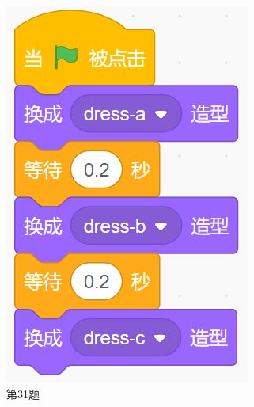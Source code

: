\documentclass[10pt, a4paper]{article}
\begin{document}
\begin{enumerate}
\begin{figure}[htbp]
\begin{minipage}[t]{.18\textwidth}
\begin{minipage}[t]{.35\textwidth}
                \end{minipage}
                \begin{minipage}[t]{.55\textwidth}
                    \centering
                    \includegraphics[width=\textwidth]{31-2.png}
                \end{minipage}
                \caption*{第31题}
            \end{minipage}
            \begin{minipage}[t]{.48\textwidth}
                \centering
                \begin{minipage}[t]{.48\textwidth}
                    \centering

\end{minipage}
\end{minipage}
\end{figure}
\end{enumerate}
\end{document}
